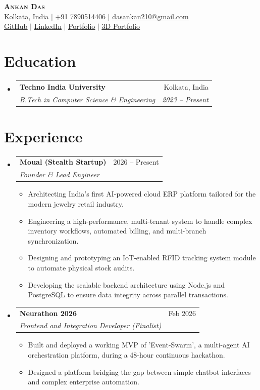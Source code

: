 \documentclass[11pt,a4paper]{article}
\makeatletter
\newcommand{\resumeItem}[1]{
  \item\small{
    {#1 \vspace{-2pt}}
  }
}
\newcommand{\resumeSubheading}[4]{
  \vspace{-2pt}\item
    \begin{tabular*}{0.97\textwidth}[t]{l@{\extracolsep{\fill}}r}
      \textbf{#1} & #2 \\
      \textit{\small#3} & \textit{\small #4} \\
    \end{tabular*}\vspace{-7pt}
}
\newcommand{\resumeSubHeadingListStart}{\begin{itemize}[leftmargin=0.15in, label={}]}
\newcommand{\resumeSubHeadingListEnd}{\end{itemize}}
\newcommand{\resumeItemListStart}{\begin{itemize}}
\newcommand{\resumeItemListEnd}{\end{itemize}\vspace{-5pt}}
\makeatother
\begin{document}
\begin{center}
    \textbf{\Huge \scshape Ankan Das} \\ \vspace{2pt}
    \small Kolkata, India $|$ +91 7890514406 $|$ \href{mailto:dasankan210@gmail.com}{\underline{dasankan210@gmail.com}} \\ \vspace{1pt}
    \href{https://github.com/mossheadzoro}{\underline{GitHub}} $|$ 
    \href{https://linkedin.com/in/ankan-das-240082328/}{\underline{LinkedIn}} $|$ 
    \href{https://ankan-portfolio-delta.vercel.app/}{\underline{Portfolio}} $|$ 
    \href{https://3-d-portfolio-seven-delta.vercel.app/}{\underline{3D Portfolio}}
\end{center}

\section{Education}
  \resumeSubHeadingListStart
    \resumeSubheading
      {Techno India University}{Kolkata, India}
      {B.Tech in Computer Science \& Engineering}{2023 -- Present}
  \resumeSubHeadingListEnd

\section{Experience}
  \resumeSubHeadingListStart
    \resumeSubheading
      {Moual (Stealth Startup)}{2026 -- Present}
      {Founder \& Lead Engineer}{}
      \resumeItemListStart
        \resumeItem{Architecting India's first AI-powered cloud ERP platform tailored for the modern jewelry retail industry.}
        \resumeItem{Engineering a high-performance, multi-tenant system to handle complex inventory workflows, automated billing, and multi-branch synchronization.}
        \resumeItem{Designing and prototyping an IoT-enabled RFID tracking system module to automate physical stock audits.}
        \resumeItem{Developing the scalable backend architecture using Node.js and PostgreSQL to ensure data integrity across parallel transactions.}
      \resumeItemListEnd

    \resumeSubheading
      {Neurathon 2026}{Feb 2026}
      {Frontend and Integration Developer (Finalist)}{}
      \resumeItemListStart
        \resumeItem{Built and deployed a working MVP of 'Event-Swarm', a multi-agent AI orchestration platform, during a 48-hour continuous hackathon.}
        \resumeItem{Designed a platform bridging the gap between simple chatbot interfaces and complex enterprise automation.}
      \resumeItemListEnd
  \resumeSubHeadingListEnd
\end{document}
